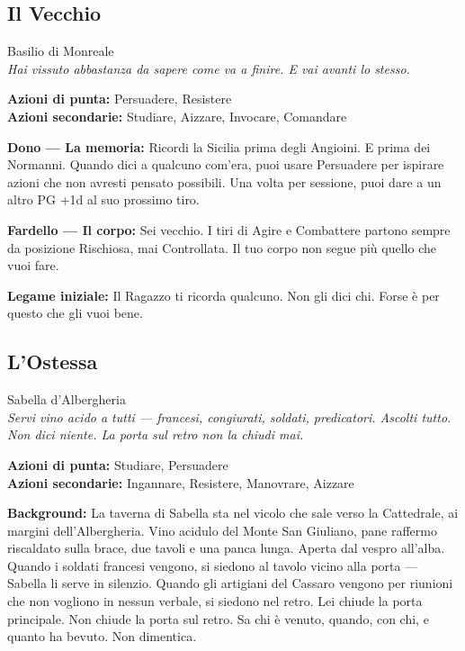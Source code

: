\filetto

\subsection{Il Vecchio}
{\cinzel\footnotesize\color{grigionote} Basilio di Monreale}\\
\textit{Hai vissuto abbastanza da sapere come va a finire.
E vai avanti lo stesso.}

\textbf{Azioni di punta:} Persuadere, Resistere\\
\textbf{Azioni secondarie:} Studiare, Aizzare, Invocare, Comandare

\textbf{Dono — La memoria:} Ricordi la Sicilia prima degli Angioini.
E prima dei Normanni. Quando dici a qualcuno com'era, puoi usare
Persuadere per ispirare azioni che non avresti pensato possibili.
Una volta per sessione, puoi dare a un altro PG +1d al suo prossimo tiro.

\textbf{Fardello — Il corpo:} Sei vecchio. I tiri di Agire e
Combattere partono sempre da posizione Rischiosa, mai Controllata.
Il tuo corpo non segue più quello che vuoi fare.

\textbf{Legame iniziale:} Il Ragazzo ti ricorda qualcuno. Non gli
dici chi. Forse è per questo che gli vuoi bene.

\filetto

\subsection{L'Ostessa}
{\cinzel\footnotesize\color{grigionote} Sabella d'Albergheria}\\
\textit{Servi vino acido a tutti — francesi, congiurati, soldati,
predicatori. Ascolti tutto. Non dici niente. La porta sul retro
non la chiudi mai.}

\textbf{Azioni di punta:} Studiare, Persuadere\\
\textbf{Azioni secondarie:} Ingannare, Resistere, Manovrare, Aizzare

\textbf{Background:} La taverna di Sabella sta nel vicolo che
sale verso la Cattedrale, ai margini dell'Albergheria. Vino
acidulo del Monte San Giuliano, pane raffermo riscaldato sulla
brace, due tavoli e una panca lunga. Aperta dal vespro all'alba.
Quando i soldati francesi vengono, si siedono al tavolo vicino
alla porta — Sabella li serve in silenzio. Quando gli artigiani
del Cassaro vengono per riunioni che non vogliono in nessun
verbale, si siedono nel retro. Lei chiude la porta principale.
Non chiude la porta sul retro. Sa chi è venuto, quando, con chi,
e quanto ha bevuto. Non dimentica.

